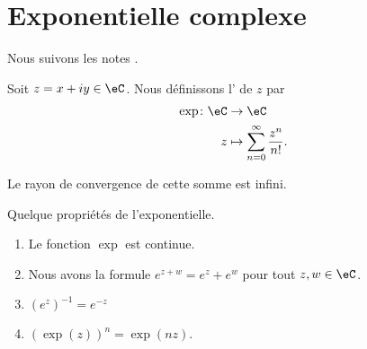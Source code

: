 \section{Exponentielle complexe}
Nous suivons les notes \cite{RomainBoilEnt}.

\begin{definition}  \label{DefJilXoM}
    Soit \( z=x+iy\in \eC\). Nous définissons l' de \( z\) par
    \begin{equation}
        \begin{aligned}
            \exp\colon \eC&\to \eC \\
            z&\mapsto \sum_{n=0}^{\infty}\frac{ z^n }{ n! }. 
        \end{aligned}
    \end{equation}
\end{definition}
Le rayon de convergence de cette somme est infini.

\begin{proposition}     \label{PropdDjisy}
    Quelque propriétés de l'exponentielle.
    \begin{enumerate}
        \item
            Le fonction \( \exp\) est continue.
        \item
            Nous avons la formule \(  e^{z+w}= e^{z}+e^w\) pour tout \( z,w\in \eC\).
        \item
            \( (e^z)^{-1}= e^{-z}\)
        \item
            \( (\exp(z))^n=\exp(nz)\).
    \end{enumerate}
\end{proposition}

